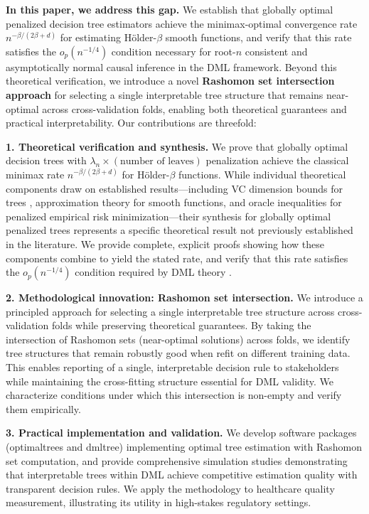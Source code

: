 \documentclass[12pt]{article}
\begin{document}
\textbf{In this paper, we address this gap.} We establish that globally optimal penalized decision tree estimators achieve the minimax-optimal convergence rate $n^{-\beta/(2\beta+d)}$ for estimating Hölder-$\beta$ smooth functions, and verify that this rate satisfies the $o_p(n^{-1/4})$ condition necessary for root-$n$ consistent and asymptotically normal causal inference in the DML framework. Beyond this theoretical verification, we introduce a novel \textbf{Rashomon set intersection approach} for selecting a single interpretable tree structure that remains near-optimal across cross-validation folds, enabling both theoretical guarantees and practical interpretability. Our contributions are threefold:

\textbf{1. Theoretical verification and synthesis.} We prove that globally optimal decision trees with $\lambda_n \times (\text{number of leaves})$ penalization achieve the classical minimax rate $n^{-\beta/(2\beta+d)}$ for Hölder-$\beta$ functions. While individual theoretical components draw on established results---including VC dimension bounds for trees \citep{bartlett2006convexity}, approximation theory for smooth functions, and oracle inequalities for penalized empirical risk minimization---their synthesis for globally optimal penalized trees represents a specific theoretical result not previously established in the literature. We provide complete, explicit proofs showing how these components combine to yield the stated rate, and verify that this rate satisfies the $o_p(n^{-1/4})$ condition required by DML theory \citep{chernozhukov2018}.

\textbf{2. Methodological innovation: Rashomon set intersection.} We introduce a principled approach for selecting a single interpretable tree structure across cross-validation folds while preserving theoretical guarantees. By taking the intersection of Rashomon sets (near-optimal solutions) across folds, we identify tree structures that remain robustly good when refit on different training data. This enables reporting of a single, interpretable decision rule to stakeholders while maintaining the cross-fitting structure essential for DML validity. We characterize conditions under which this intersection is non-empty and verify them empirically.

\textbf{3. Practical implementation and validation.} We develop software packages (optimaltrees and dmltree) implementing optimal tree estimation with Rashomon set computation, and provide comprehensive simulation studies demonstrating that interpretable trees within DML achieve competitive estimation quality with transparent decision rules. We apply the methodology to healthcare quality measurement, illustrating its utility in high-stakes regulatory settings.
\end{document}
